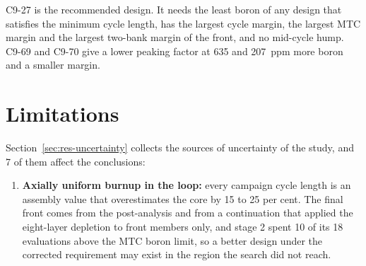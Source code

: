 C9-27 is the recommended design. It needs the least boron of any design
that satisfies the minimum cycle length, has the largest cycle margin,
the largest MTC margin and the largest two-bank margin of the front, and
no mid-cycle hump. C9-69 and C9-70 give a lower peaking
factor at 635 and \SI{207}{ppm} more boron and a smaller margin.

\section{Limitations}
\label{sec:concl-limits}

Section~\ref{sec:res-uncertainty} collects the sources of uncertainty
of the study, and 7 of them affect the conclusions:

\begin{enumerate}
  \item \textbf{Axially uniform burnup in the loop:} every campaign
        cycle length is an assembly value that overestimates the core
        by 15 to 25 per cent. The final front comes from the
        post-analysis and from a continuation that applied the
        eight-layer depletion to front members only, and stage 2 spent
        10 of its 18 evaluations above the MTC boron limit, so a better
        design under the corrected requirement may exist in the region
        the search did not reach.
  

\end{enumerate}
